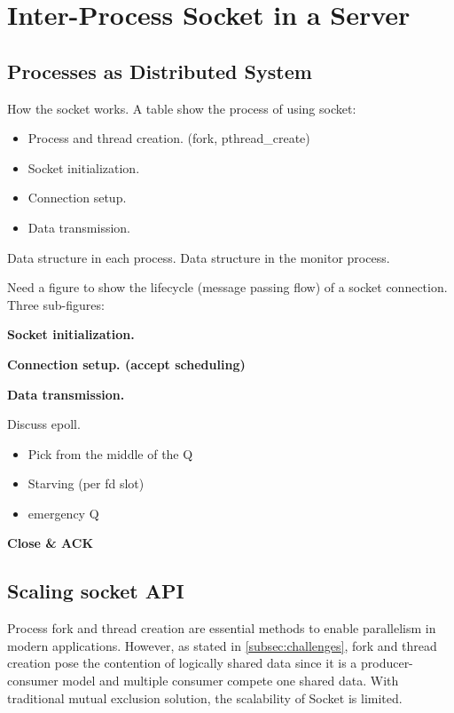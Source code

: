 \section{Inter-Process Socket in a Server}
\label{sec:intra-server}

\subsection{Processes as Distributed System}
\label{subsec:socket-api}

How the socket works. A table show the process of using socket:

\begin{itemize}
	\item Process and thread creation. (fork, pthread\_create)
	\item Socket initialization.
	\item Connection setup.
	\item Data transmission.
\end{itemize}


Data structure in each process. Data structure in the monitor process.

Need a figure to show the lifecycle (message passing flow) of a socket connection. Three sub-figures:


	 \textbf{Socket initialization.}
	  
	 \textbf{Connection setup. (accept scheduling)}
	 
	 \textbf{Data transmission.}
	 
	 Discuss epoll.
\begin{itemize}
	\item Pick from the middle of the Q
	\item Starving (per fd slot)
	\item emergency Q
\end{itemize}

    \textbf{Close \& ACK}


\subsection{Scaling socket API}
\label{subsec:fork}

Process fork and thread creation are essential methods to enable parallelism in modern applications. 
However, as stated in \ref{subsec:challenges}, fork and thread creation pose the contention of logically shared data since it is a producer-consumer model and multiple consumer compete one shared data. With traditional mutual exclusion solution, the scalability of Socket is limited.

